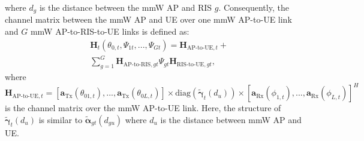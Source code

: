 \documentclass[conference]{IEEEtran}
\begin{document}
where $d_{g}$ is the distance between the mmW AP and RIS $g$. Consequently, the channel matrix between the mmW AP and UE over one mmW AP-to-UE link and $G$ mmW AP-to-RIS-to-UE links is defined as:
\begin{align}
& \boldsymbol{H}_t(\theta_{0,t},\Psi_{1t},...,\Psi_{Gt})= \boldsymbol{H}_{\text{AP-to-UE},t}+\nonumber \\ &
\sum_{g=1}^G \boldsymbol{H}_{\text{AP-to-RIS},gt} \Psi_{gt} \boldsymbol{H}_{\text{RIS-to-UE},gt},
\label{H_total}
\end{align}
where $\boldsymbol{H}_{\text{AP-to-UE},t}=[\boldsymbol{a}_{\text{Tx}}(\theta_{01,t}),...,\boldsymbol{a}_{\text{Tx}}(\theta_{0L,t})] \times \text{diag}(\tilde{\boldsymbol{\gamma}}_{t}(d_u)) \times [\boldsymbol{a}_{\text{Rx}}(\phi_{1,t}),...,\boldsymbol{a}_{\text{Rx}}(\phi_{L,t})]^H$ is the channel matrix over the mmW AP-to-UE link. Here, the structure of  $\tilde{\boldsymbol{\gamma}}_{t}(d_{u})$ is similar to  $\tilde{\boldsymbol{\alpha}}_{gt}(d_{gu})$ where $d_{u}$ is the distance between mmW AP and UE.
\end{document}
